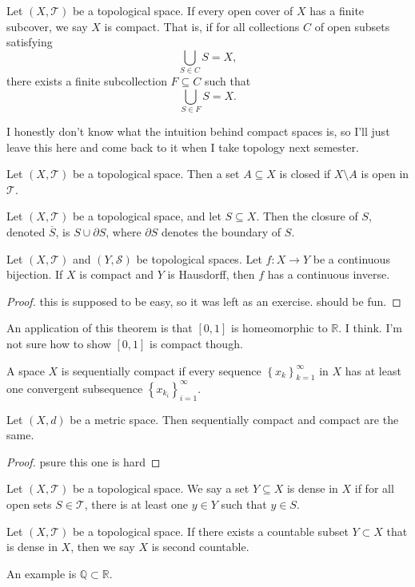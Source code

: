 \documentclass[11pt, letterpaper]{report}
\begin{document}
\begin{definition}\label{dfn:7}
	Let $(X,\mathcal{T} )$ be a topological space. If every open cover of $X$ has a finite subcover, we say $X$ is compact. That is, if for all collections $C$ of open subsets satisfying
	\[
		\bigcup_{S\in C}S=X 
	,\]
	there exists a finite subcollection $F\subseteq C$ such that
	\[
		\bigcup_{S\in F}S=X 
	.\]
\end{definition}
I honestly don't know what the intuition behind compact spaces is, so I'll just leave this here and come back to it when I take topology next semester.
\begin{definition}\label{dfn:8}
	Let $(X,\mathcal{T} )$ be a topological space. Then a set $A\subseteq X$ is closed if $X\setminus A$ is open in $\mathcal{T} $.
\end{definition}
\begin{definition}[Closure]\label{dfn:9}
	Let $(X,\mathcal{T} )$ be a topological space, and let $S\subseteq X$. Then the closure of $S$, denoted $\overline{S} $, is $S\cup \partial S$, where $\partial S$ denotes the boundary of $S$.
\end{definition}
\begin{theorem}\label{thm:1}
	Let $(X,\mathcal{T} )$ and $(Y,\mathcal{S} )$ be topological spaces. Let $f : X \to Y$ be a continuous bijection. If $X$ is compact and $Y$ is Hausdorff, then $f$ has a continuous inverse.
\end{theorem}
\begin{proof}
	this is supposed to be easy, so it was left as an exercise. should be fun.
\end{proof}
An application of this theorem is that $[0,1]$ is homeomorphic to $\mathbb{R}$. I think. I'm not sure how to show $[0,1]$ is compact though.
\begin{definition}\label{dfn:10}
	A space $X$ is sequentially compact if every sequence $\left\{ x_k \right\}_{k=1}^\infty$ in $X$ has at least one convergent subsequence  $\left\{ x_{k_i} \right\}_{i=1}^\infty$.
\end{definition}
\begin{theorem}\label{thm:2}
	Let $(X,d)$ be a metric space. Then sequentially compact and compact are the same.
\end{theorem}
\begin{proof}
	psure this one is hard
\end{proof}
\begin{definition}[Dense]\label{dfn:11}
	Let $(X,\mathcal{T} )$ be a topological space. We say a set $Y\subseteq X$ is dense in $X$ if for all open sets $S\in \mathcal{T} $, there is at least one $y\in Y$ such that $y\in S$.
\end{definition}
\begin{definition}\label{dfn:12}
	Let $(X,\mathcal{T} )$ be a topological space. If there exists a countable subset $Y\subset X$ that is dense in $X$, then we say $X$ is second countable.
\end{definition}
An example is $\mathbb{Q}\subset \mathbb{R}$.
\end{document}
